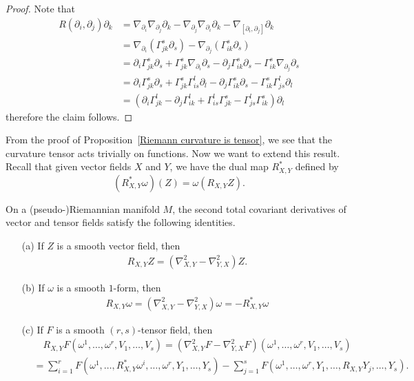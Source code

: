 \begin{proof}
Note that
\begin{align*}
R(\partial_i,\partial_j)\partial_k&=\nabla_{\partial_i}\nabla_{\partial_j}\partial_k-\nabla_{\partial_j}\nabla_{\partial_i}\partial_k-\nabla_{[\partial_i,\partial_j]}\partial_k\\
&=\nabla_{\partial_i}(\Gamma_{jk}^s\partial_s)-\nabla_{\partial_j}(\Gamma_{ik}^s\partial_s)\\
&=\partial_i\Gamma_{jk}^s\partial_s+\Gamma_{jk}^s\nabla_{\partial_i}\partial_s-\partial_j\Gamma_{ik}^s\partial_s-\Gamma_{ik}^s\nabla_{\partial_j}\partial_s\\
&=\partial_i\Gamma_{jk}^s\partial_s+\Gamma_{jk}^s\Gamma_{is}^l\partial_l-\partial_j\Gamma_{ik}^s\partial_s-\Gamma_{ik}^s\Gamma_{js}^l\partial_l\\
&=(\partial_i\Gamma_{jk}^l-\partial_j\Gamma_{ik}^l+\Gamma_{is}^l\Gamma_{jk}^s-\Gamma_{js}^l\Gamma_{ik}^s)\partial_l
\end{align*}
therefore the claim follows.
\end{proof}
From the proof of Proposition~\ref{Riemann curvature is tensor}, we see that the curvature tensor acts trivially on functions. Now we want to extend this result. Recall that given vector fields $X$ and $Y$, we have the dual map $R_{X,Y}^*$ defined by
\[(R_{X,Y}^*\omega)(Z)=\omega(R_{X,Y}Z).\]
\begin{theorem}
On a (pseudo-)Riemannian manifold $M$, the second total covariant derivatives of vector and tensor fields satisfy the following identities.
\begin{itemize}
\item[(a)] If $Z$ is a smooth vector field, then
\begin{align}\label{Riemann Ricci identity-1}
R_{X,Y}Z=(\nabla_{X,Y}^2-\nabla_{Y,X}^2)Z.
\end{align}
\item[(b)] If $\omega$ is a smooth $1$-form, then
\begin{align}\label{Riemann Ricci identity-2}
R_{X,Y}\omega=(\nabla_{X,Y}^2-\nabla_{Y,X}^2)\omega=-R_{X,Y}^*\omega
\end{align}
\item[(c)] If $F$ is a smooth $(r,s)$-tensor field, then
\begin{equation}\label{Riemann Ricci identity-3}
\begin{aligned}
&\quad R_{X,Y}F(\omega^1,\dots,\omega^r,V_1,\dots,V_s)=(\nabla_{X,Y}^2F-\nabla_{Y,X}^2F)(\omega^1,\dots,\omega^r,V_1,\dots,V_s)\\
&=\sum_{i=1}^rF(\omega^1,\dots,R_{X,Y}^*\omega^i,\dots,\omega^r,Y_1,\dots,Y_s)-\sum_{j=1}^sF(\omega^1,\dots,\omega^r,Y_1,\dots,R_{X,Y}Y_j,\dots,Y_s).
\end{aligned}
\end{equation}
\end{itemize}
\end{theorem}
